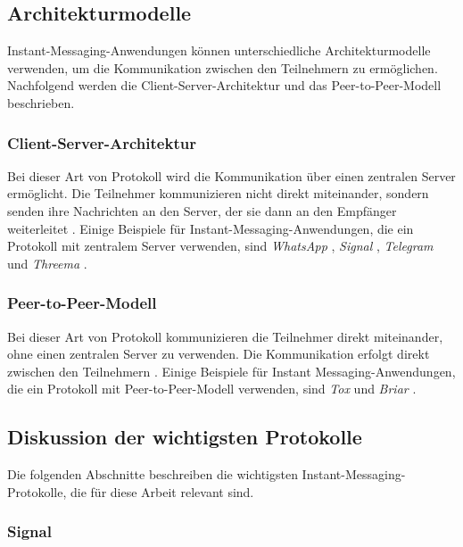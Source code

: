 \subsection{Architekturmodelle}

Instant-Messaging-Anwendungen können unterschiedliche Architekturmodelle verwenden, um die Kommunikation zwischen den Teilnehmern zu ermöglichen. Nachfolgend werden die Client-Server-Architektur und das Peer-to-Peer-Modell beschrieben.

\subsubsection{Client-Server-Architektur}

Bei dieser Art von Protokoll wird die Kommunikation über einen zentralen Server ermöglicht. Die Teilnehmer kommunizieren nicht direkt miteinander, sondern senden ihre Nachrichten an den Server, der sie dann an den Empfänger weiterleitet \parencite[S. 3]{Hanson_ServerManagement}. Einige Beispiele für Instant-Messaging-Anwendungen, die ein Protokoll mit zentralem Server verwenden, sind \textit{WhatsApp} \parencite{Vanerio_WhatsAppArchitecture}, \textit{Signal} \parencite{Github_libsignal}, \textit{Telegram} \parencite{Telegram_ServerSourceCode} und \textit{Threema} \parencite{Threema_ServerLocation}.

\subsubsection{Peer-to-Peer-Modell}

Bei dieser Art von Protokoll kommunizieren die Teilnehmer direkt miteinander, ohne einen zentralen Server zu verwenden. Die Kommunikation erfolgt direkt zwischen den Teilnehmern \parencites[S. 6-8]{Mahlmann_P2PNetzwerke}{Galuba_P2POverlayNetworks}. Einige Beispiele für Instant Messaging-Anwendungen, die ein Protokoll mit Peer-to-Peer-Modell verwenden, sind \textit{Tox} \parencite{Tox_FAQ} und \textit{Briar} \parencite{Briar_HowItWorks}.


\subsection{Diskussion der wichtigsten Protokolle}

Die folgenden Abschnitte beschreiben die wichtigsten Instant-Messaging-Protokolle, die für diese Arbeit relevant sind.

\subsubsection{Signal}
\label{subsubsection:signal}

